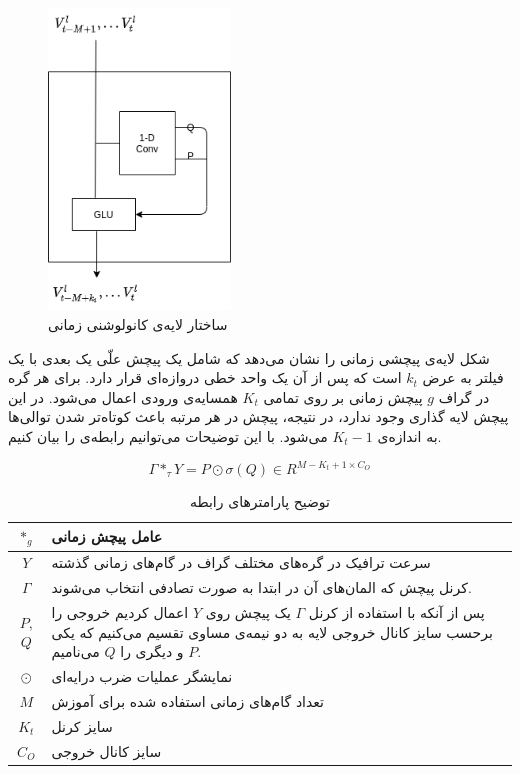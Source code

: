 \begin{figure}
  \includegraphics[height=8cm]{./images/time-conv.png}
  \centering
  \caption{
ساختار لایه‌ی کانولوشنی زمانی 
  }
  \label{fig:time-conv}
\end{figure}

شکل  لایه‌ی پیچشی زمانی را نشان می‌دهد که شامل یک پیچش علّی یک بعدی
با یک فیلتر به عرض  $k_{t}$ است که پس از آن یک واحد خطی دروازه‌ای قرار دارد.
برای هر گره در گراف $g$ پیچش زمانی بر روی تمامی $K_{t}$ همسایه‌ی ورودی اعمال می‌شود.
در این پیچش لایه گذاری وجود ندارد‌‌، در نتیجه، پیچش در هر مرتبه باعث کوتاه‌تر شدن توالی‌ها به اندازه‌ی $K_{t}-1$ می‌شود.
با این توضیحات می‌توانیم رابطه‌ی  را بیان کنیم.

\begin{equation}
  \Gamma *_{\tau} Y = P \odot \sigma (Q) \in R^{M-K_{t}+1 \times C_{O}}
  \label{eq:time-conv}
\end{equation}

\begin{table}[h]
  \centering
  \caption{توضیح پارامترهای رابطه }
  \begin{tabular}{|c|p{}|}
    \hline
    $*_{g}$ & عامل پیچش زمانی \\
    \hline
    $Y$ & سرعت ترافیک در گره‌های مختلف گراف در گام‌های زمانی گذشته \\
    \hline
    $\Gamma$ & کرنل پیچش که المان‌های آن در ابتدا به صورت تصادفی انتخاب می‌شوند. \\
    \hline
    $P$, $Q$ & پس از آنکه با استفاده از کرنل $\Gamma$ یک پیچش روی $Y$ اعمال کردیم خروجی را برحسب سایز کانال خروجی لایه به دو نیمه‌ی مساوی تقسیم می‌کنیم که یکی $P$ و دیگری را $Q$ می‌نامیم. \\
    \hline
    $\odot$ & نمایشگر عملیات ضرب درایه‌ای \\
    \hline
    $M$ & تعداد گام‌های زمانی استفاده شده برای آموزش \\
    \hline
    $K_{t}$ & سایز کرنل \\
    \hline
    $C_{O}$ & سایز کانال خروجی \\
    \hline
  \end{tabular}
  \label{tbl:distance}
\end{table}

